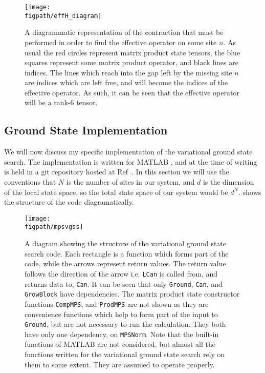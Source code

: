 \begin{figure}[ht!]
\centering
\texttt{[image: \\figpath/effH\_diagram]}
\caption{A diagrammatic representation of the contraction that must be performed in order to find the effective operator on some site \(n\). As usual the red circles represent matrix product state tensors, the blue squares represent some matrix product operator, and black lines are indices. The lines which reach into the gap left by the missing site \(n\) are indices which are left free, and will become the indices of the effective operator. As such, it can be seen that the effective operator will be a rank-6 tensor.}
\label{fig:vs1-3}
\end{figure}

\FloatBarrier
 \subsection{Ground State Implementation}
 We will now discuss my specific implementation of the variational ground state search. The implementation is written for MATLAB \cite{MATLAB}, and at the time of writing is held in a git repository hosted at Ref~\cite{otb:gitVGSS}. In this section we will use the conventions that \(N\) is the number of sites in our system, and \(d\) is the dimension of the local state space, so the total state space of our system would be \(d^{N}\).  shows the structure of the code diagramatically.
 
 \begin{figure}[ht!]
 \centering
 \texttt{[image: \\figpath/mpsvgss]}
 \caption{A diagram showing the structure of the variational ground state search code. Each rectangle is a function which forms part of the code, while the arrows represent return values. The return value follows the direction of the arrow i.e. \lstinline$LCan$ is called from, and returns data to, \lstinline$Can$. It can be seen that only \lstinline$Ground$, \lstinline$Can$, and \lstinline$GrowBlock$ have dependencies. The matrix product state constructor functions \lstinline$CompMPS$, and \lstinline$ProdMPS$ are not shown as they are convenience functions which help to form part of the input to \lstinline$Ground$, but are not necessary to run the calculation. They both have only one dependency, on \lstinline$MPSNorm$. Note that the built-in functions of MATLAB \cite{MATLAB} are not considered, but almost all the functions written for the variational ground state search rely on them to some extent. They are assumed to operate properly.}
 \label{fig:vs2-1}
 \end{figure}
 
